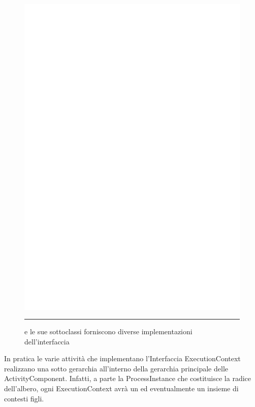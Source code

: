 \begin{figure}[t!]
\begin{center}
\includegraphics[scale=0.85]
{architettura_interna/dia/cntxclass}
\caption[ExecutionContext Class Diagram]{
   	 e le sue sottoclassi forniscono 
   	diverse implementazioni dell'interfaccia	 }
   	\rule{7cm}{0.01cm}
  \label{fig:cntxclass}
\end{center}
\end{figure}

In pratica le varie attività che implementano l'Interfaccia ExecutionContext
realizzano una sotto gerarchia all'interno della gerarchia principale delle
ActivityComponent. Infatti, a parte la ProcessInstance che costituisce la
radice dell'albero, ogni ExecutionContext avrà un  ed
eventualmente un insieme di contesti figli.

